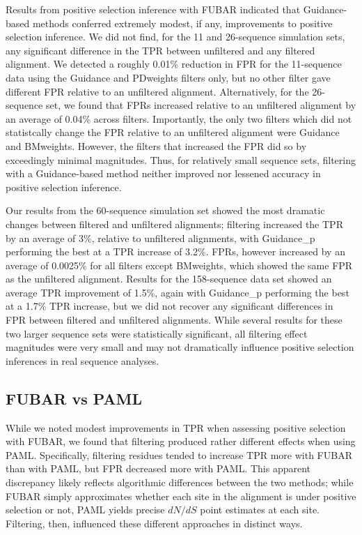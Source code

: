 \documentclass[10pt]{article}
\begin{document}
Results from positive selection inference with FUBAR indicated that Guidance-based methods conferred extremely modest, if any, improvements to positive selection inference. We did not find, for the 11 and 26-sequence simulation sets, any significant difference in the TPR between unfiltered and any filtered alignment. We detected a roughly 0.01\% reduction in FPR for the 11-sequence data using the Guidance and PDweights filters only, but no other filter gave different FPR relative to an unfiltered alignment. 
Alternatively, for the 26-sequence set, we found that FPRs increased relative to an unfiltered alignment by an average of 0.04\% across filters. Importantly, the only two filters which did not statistcally change the FPR relative to an unfiltered alignment were Guidance and BMweights. However, the filters that increased the FPR did so by exceedingly minimal magnitudes. Thus, for relatively small sequence sets, filtering with a Guidance-based method neither improved nor lessened accuracy in positive selection inference.

Our results from the 60-sequence simulation set showed the most dramatic changes between filtered and unfiltered alignments; filtering increased the TPR by an average of 3\%, relative to unfiltered alignments, with Guidance_p performing the best at a TPR increase of 3.2\%. FPRs, however increased by an average of 0.0025\% for all filters except BMweights, which showed the same FPR as the unfiltered alignment. Results for the 158-sequence data set showed an average TPR improvement of 1.5\%, again with Guidance_p performing the best at a 1.7\% TPR increase, but we did not recover any significant differences in FPR between filtered and unfiltered alignments. While several results for these two larger sequence sets were statistically significant, all filtering effect magnitudes were very small and may not dramatically influence positive selection inferences in real sequence analyses.


\subsection*{FUBAR vs PAML}

While we noted modest improvements in TPR when assessing positive selection with FUBAR, we found that filtering produced rather different effects when using PAML. Specifically, filtering residues tended to increase TPR more with FUBAR than with PAML, but FPR decreased more with PAML. This apparent discrepancy likely reflects algorithmic differences between the two methods; while FUBAR simply approximates whether each site in the alignment is under positive selection or not, PAML yields precise $dN/dS$ point estimates at each site. Filtering, then, influenced these different approaches in distinct ways. 
\end{document}
